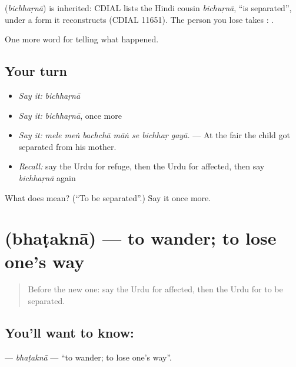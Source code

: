 \begin{cousinweb}
\textbf{} (\emph{bichhaṛnā}) is inherited: CDIAL lists the Hindi cousin \emph{bichuṛnā}, \textquotedblleft{}is separated\textquotedblright{}, under a form it reconstructs (CDIAL 11651). The person you lose takes \textbf{}: \textbf{   }.
\end{cousinweb}

\begin{grammarlens}[title={What you've built}]
One more word for telling what happened.
\end{grammarlens}

\subsection*{Your turn}
\begin{itemize}
\raggedright
  \item \emph{Say it:} \emph{bichhaṛnā}
  \item \emph{Say it:} \emph{bichhaṛnā}, once more
  \item \emph{Say it:} \emph{mele meṅ bachchā māṅ se bichhaṛ gayā.} — At the fair the child got separated from his mother.
  \item \emph{Recall:} say the Urdu for refuge, then the Urdu for affected, then say \emph{bichhaṛnā} again
\end{itemize}

\begin{tcolorbox}[breakable,colback=teal!4,colframe=teal!35!black,title={Before you move on}]
What does  mean? (\textquotedblleft{}To be separated\textquotedblright{}.) Say it once more.
\end{tcolorbox}
\section[\texorpdfstring{\ur{بھٹکنا} (bhaṭaknā)}{بھٹکنا (bhaṭaknā)}]{ (bhaṭaknā) — to wander; to lose one's way}

\label{lesson:UR-C298-bhatakna}



\begin{quote}
Before the new one: say the Urdu for affected, then the Urdu for to be separated.
\end{quote}

\subsection*{You'll want to know: }
\textbf{} — \emph{bhaṭaknā} — \textquotedblleft{}to wander; to lose one's way\textquotedblright{}.

